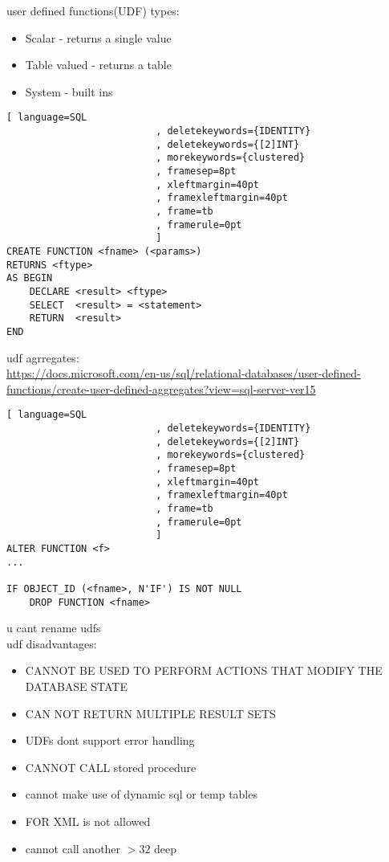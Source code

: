 \documentclass{article}
\begin{document}
    \begin{section}{user defined functions(UDF)}
        types:
        \begin{itemize}
            \item Scalar - returns a single value
            \item Table valued - returns a table
            \item System - built ins
        \end{itemize}

        \begin{lstlisting}[ language=SQL
                          , deletekeywords={IDENTITY}
                          , deletekeywords={[2]INT}
                          , morekeywords={clustered}
                          , framesep=8pt
                          , xleftmargin=40pt
                          , framexleftmargin=40pt
                          , frame=tb
                          , framerule=0pt 
                          ]
CREATE FUNCTION <fname> (<params>)
RETURNS <ftype>
AS BEGIN
    DECLARE <result> <ftype>
    SELECT  <result> = <statement>
    RETURN  <result>
END
        \end{lstlisting}
        udf agrregates: \\
        \url{https://docs.microsoft.com/en-us/sql/relational-databases/user-defined-functions/create-user-defined-aggregates?view=sql-server-ver15}
    
        \begin{lstlisting}[ language=SQL
                          , deletekeywords={IDENTITY}
                          , deletekeywords={[2]INT}
                          , morekeywords={clustered}
                          , framesep=8pt
                          , xleftmargin=40pt
                          , framexleftmargin=40pt
                          , frame=tb
                          , framerule=0pt 
                          ]
ALTER FUNCTION <f>
...

IF OBJECT_ID (<fname>, N'IF') IS NOT NULL
    DROP FUNCTION <fname>
        \end{lstlisting}

    u cant rename udfs \\
    udf disadvantages:
    \begin{itemize}
        \item CANNOT BE USED TO PERFORM ACTIONS THAT MODIFY THE DATABASE STATE
        \item CAN NOT RETURN MULTIPLE RESULT SETS
        \item UDFs dont support error handling
        \item CANNOT CALL stored procedure
        \item cannot make use of dynamic sql or temp tables
        \item FOR XML is not allowed
        \item cannot call another $>32$ deep
    \end{itemize}
    \end{section}
\end{document}
